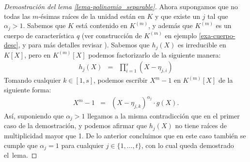 \documentclass[10pt]{article}
\newcommand{\0}{\mathbf{0}}
\newcommand{\1}{\mathbf{1}}
\newcommand{\+}{\oplus}
\newcommand{\comentarioin}[1]{}
\theoremstyle{remark}
\theoremstyle{remark}
\begin{document}
\begin{proof}[Demostración del lema \ref{lema-polinomio_separable}]
	Ahora supongamos que no todas las $m$-ésimas raíces de la unidad están en $K$ y que existe un $j$ tal que $\alpha_j>1$. Sabemos que $K$ está contenido en $K^{(m)}$, y además que $K^{(m)}$ es un cuerpo de característica $q$ (ver construcción de $K^{(m)}$ en ejemplo \ref{exa-cuerpo-desc}, y para más detalles revisar \cite{AlgebraLang}).
        Sabemos que $h_j(X)$ es irreducible en $K[X]$, pero en $K^{(m)}[X]$ podemos factorizarlo de la siguiente manera:
		\begin{eqnarray*}
			h_j(X) & = &\prod_{i=1}^{s} (X-\eta_{j,i})
		\end{eqnarray*}
Tomando cualquier $k\in [1,s]$, podemos escribir $X^m - 1$ en
$K^{(m)}[X]$ de la siguiente forma:
\begin{eqnarray*}
	X^m-1 &=& (X-\eta_{j,k})^{\alpha_j}\cdot g(X).
\end{eqnarray*}
Así, suponiendo que $\alpha_j >1$ llegamos a la misma contradicción
que en el primer caso de la demostración, y podemos afirmar que
$h_j(X)$ no tiene raíces de multiplicidad mayor que 1. De lo anterior
concluimos que en este caso también se cumple que $\alpha_j=1$ para
cualquier $j\in \{1,...,t\}$, con lo cual queda demostrado el~lema.
\end{proof}  

\end{document}
